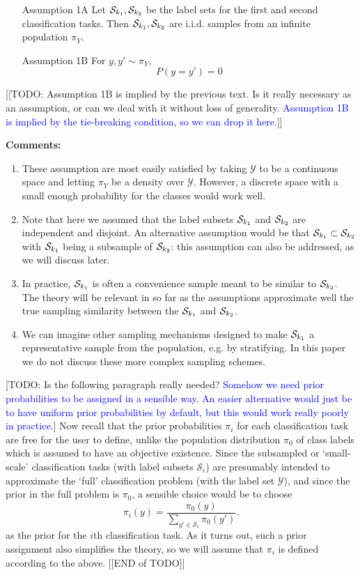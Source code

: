 \documentclass[12pt]{article}
\begin{document}
\begin{itemize}
\item[Assumption 1A] Let $\mathcal{S}_{k_1}, \mathcal{S}_{k_2}$ be the label sets
for the first and second classification tasks. Then $\mathcal{S}_{k_1}, 
\mathcal{S}_{k_2}$ are i.i.d. samples from an infinite population $\pi_Y$.
\item[Assumption 1B] For $y,y'\sim \pi_Y$, 
\[P(y=y')=0\]
\end{itemize}
[[TODO: Assumption 1B is implied by the previous text. Is it really necessary as an assumption, or can we deal with it without loss of generality. \textcolor{blue}{Assumption 1B is implied by the tie-breaking condition, so we can drop it here.}]]

\textbf{Comments:}
\begin{enumerate}
\item These assumption are most easily satisfied by taking $\mathcal{Y}$ 
to be a continuous space and letting $\pi_Y$ be a density over $\mathcal{Y}$. However, a discrete space with a small enough 
probability for the classes would work well. 
\item Note that here we assumed that the label subsets $\mathcal{S}_{k_1}$ and
$\mathcal{S}_{k_2}$ are independent and disjoint. An alternative
assumption would be that $\mathcal{S}_{k_1} \subset
\mathcal{S}_{k_2}$ with $\mathcal{S}_{k_1}$ being a subsample of
$\mathcal{S}_{k_2}$: this assumption can also be addressed, as we will
discuss later.
\item 
In practice, $\mathcal{S}_{k_1}$ is often a convenience sample meant to be similar to $\mathcal{S}_{k_2}$. The theory will be relevant in so far as the assumptions approximate well the true sampling similarity between the $\mathcal{S}_{k_1}$ and $\mathcal{S}_{k_2}$. 
\item We can imagine other sampling mechanisms designed to make $\mathcal{S}_{k_1}$ a representative sample from the population, e.g. by stratifying. In this paper we do not discuss these more complex sampling schemes. 
\end{enumerate}

[TODO: Is the following paragraph really needed? \textcolor{blue}{Somehow we need prior probabilities to be assigned in a sensible way.  An easier alternative would just be to have uniform prior probabilities by default, but this would work really poorly in practice.}]
Now recall that the prior probabilities $\pi_i$ for each
classification task are free for the user to define, unlike the
population distribution $\pi_0$ of class labels which is assumed to
have an objective existence.  Since the subsampled or `small-scale'
classification tasks (with label subsets $\mathcal{S}_i$) are
presumably intended to approximate the `full' classification problem
(with the label set $\mathcal{Y}$), and since the prior in the full
problem is $\pi_0$, a sensible choice would be to choose
\[
\pi_i(y) = \frac{\pi_0(y)}{\sum_{y' \in \mathcal{S}_i} \pi_0(y')}.
\]
as the prior for the $i$th classification task.  As it turns out, such
a prior assignment also simplifies the theory, so we will assume that
$\pi_i$ is defined according to the above.
[[END of TODO]]
\end{document}
